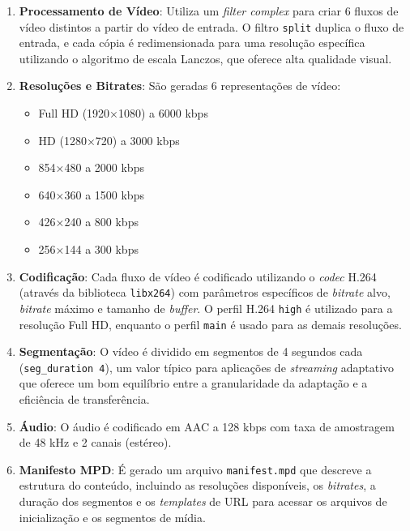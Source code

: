 \begin{enumerate}
    \item \textbf{Processamento de Vídeo}: Utiliza um \textit{filter complex} para criar 6 fluxos de vídeo distintos a partir do vídeo de entrada. O filtro \texttt{split} duplica o fluxo de entrada, e cada cópia é redimensionada para uma resolução específica utilizando o algoritmo de escala Lanczos, que oferece alta qualidade visual.
    
    \item \textbf{Resoluções e Bitrates}: São geradas 6 representações de vídeo:
    \begin{itemize}
        \item Full HD (1920×1080) a 6000 kbps
        \item HD (1280×720) a 3000 kbps
        \item 854×480 a 2000 kbps
        \item 640×360 a 1500 kbps
        \item 426×240 a 800 kbps
        \item 256×144 a 300 kbps
    \end{itemize}
    
    \item \textbf{Codificação}: Cada fluxo de vídeo é codificado utilizando o \textit{codec} H.264 (através da biblioteca \texttt{libx264}) com parâmetros específicos de \textit{bitrate} alvo, \textit{bitrate} máximo e tamanho de \textit{buffer}. O perfil H.264 \texttt{high} é utilizado para a resolução Full HD, enquanto o perfil \texttt{main} é usado para as demais resoluções.
    
    \item \textbf{Segmentação}: O vídeo é dividido em segmentos de 4 segundos cada (\texttt{seg\_duration 4}), um valor típico para aplicações de \textit{streaming} adaptativo que oferece um bom equilíbrio entre a granularidade da adaptação e a eficiência de transferência.
    
    \item \textbf{Áudio}: O áudio é codificado em AAC a 128 kbps com taxa de amostragem de 48 kHz e 2 canais (estéreo).
    
    \item \textbf{Manifesto MPD}: É gerado um arquivo \texttt{manifest.mpd} que descreve a estrutura do conteúdo, incluindo as resoluções disponíveis, os \textit{bitrates}, a duração dos segmentos e os \textit{templates} de URL para acessar os arquivos de inicialização e os segmentos de mídia.
\end{enumerate}

